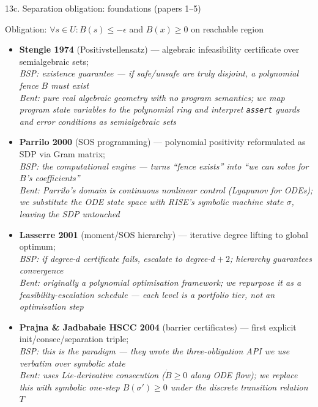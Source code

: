 \documentclass[aspectratio=169]{beamer}
\begin{document}
\begin{frame}[shrink=52]{13c. Separation obligation: foundations (papers 1--5)}
\begin{block}{Obligation: \(\forall s\in U: B(s)\le-\epsilon\) and \(B(x)\ge 0\) on reachable region}
\end{block}
\begin{itemize}
  \item \textbf{Stengle 1974} (Positivstellensatz) --- algebraic infeasibility certificate over semialgebraic sets;\\
    \textcolor{blue!75!black}{\textit{BSP: existence guarantee --- if safe/unsafe are truly disjoint, a polynomial fence \(B\) must exist}}\\
    \textcolor{orange!80!black}{\textit{Bent: pure real algebraic geometry with no program semantics; we map program state variables to the polynomial ring and interpret \texttt{assert} guards and error conditions as semialgebraic sets}}
  \item \textbf{Parrilo 2000} (SOS programming) --- polynomial positivity reformulated as SDP via Gram matrix;\\
    \textcolor{blue!75!black}{\textit{BSP: the computational engine --- turns ``fence exists'' into ``we can solve for \(B\)'s coefficients''}}\\
    \textcolor{orange!80!black}{\textit{Bent: Parrilo's domain is continuous nonlinear control (Lyapunov for ODEs); we substitute the ODE state space with RISE's symbolic machine state \(\sigma\), leaving the SDP untouched}}
  \item \textbf{Lasserre 2001} (moment/SOS hierarchy) --- iterative degree lifting to global optimum;\\
    \textcolor{blue!75!black}{\textit{BSP: if degree-\(d\) certificate fails, escalate to degree-\(d{+}2\); hierarchy guarantees convergence}}\\
    \textcolor{orange!80!black}{\textit{Bent: originally a polynomial \emph{optimisation} framework; we repurpose it as a \emph{feasibility-escalation} schedule --- each level is a portfolio tier, not an optimisation step}}
  \item \textbf{Prajna \& Jadbabaie HSCC 2004} (barrier certificates) --- first explicit init/consec/separation triple;\\
    \textcolor{blue!75!black}{\textit{BSP: this \emph{is} the paradigm --- they wrote the three-obligation API we use verbatim over symbolic state}}\\
    \textcolor{orange!80!black}{\textit{Bent: uses Lie-derivative consecution (\(\dot B\ge0\) along ODE flow); we replace this with symbolic one-step \(B(\sigma')\ge0\) under the discrete transition relation \(T\)}}

\end{itemize}
\end{frame}
\end{document}
